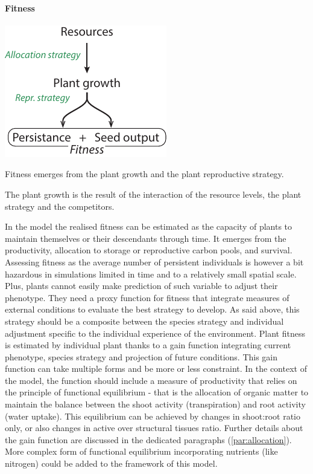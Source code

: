 \documentclass[a4paper,twoside, justified,marginals=raggedright, nobib]{tufte-handout}
\begin{document}
\paragraph{Fitness}
\begin{marginfigure}
\includegraphics{./Figures/fitness.pdf}
\caption{Fitness emerges from the plant growth and the plant reproductive strategy.}
\begin{footnotesize}
The plant growth is the result of the interaction of the resource levels, the plant strategy and the competitors.
\end{footnotesize}
\end{marginfigure}
In the model the realised fitness can be estimated as the capacity of plants to maintain themselves or their descendants through time. It emerges from the productivity, allocation to storage or reproductive carbon pools, and survival. Assessing fitness as the average number of persistent individuals is however a bit hazardous in simulations limited in time and to a relatively small spatial scale. Plus, plants cannot easily make prediction of such variable to adjust their phenotype. They need a proxy function for fitness that integrate measures of external conditions to evaluate the best strategy to develop. As said above, this strategy should be a composite between the species strategy and individual adjustment specific to the individual experience of the environment. Plant fitness is estimated by individual plant thanks to a gain function integrating current phenotype, species strategy and projection of future conditions. This gain function can take multiple forms and be more or less constraint. In the context of the model, the function should include a measure of productivity that relies on the principle of functional equilibrium - that is the allocation of organic matter to maintain the balance between the shoot activity (transpiration) and root activity (water uptake). This equilibrium can be achieved by changes in shoot:root ratio only, or also changes in active over structural tissues ratio. Further details about the gain function are discussed in the dedicated paragraphs (\ref{par:allocation}). More complex form of functional equilibrium incorporating nutrients (like nitrogen) could be added to the framework of this model.
\end{document}

